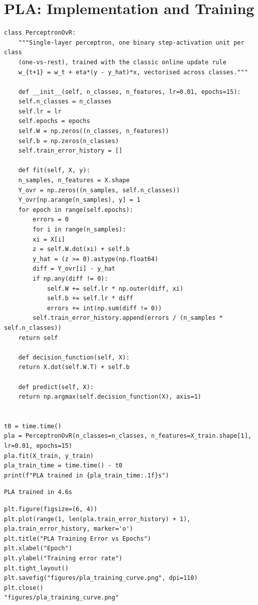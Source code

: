 \documentclass[11pt]{article}
\begin{document}
\section{PLA: Implementation and Training}
\label{sec:org7e2eefa}

\begin{verbatim}
class PerceptronOvR:
    """Single-layer perceptron, one binary step-activation unit per class
    (one-vs-rest), trained with the classic online update rule
    w_{t+1} = w_t + eta*(y - y_hat)*x, vectorised across classes."""

    def __init__(self, n_classes, n_features, lr=0.01, epochs=15):
	self.n_classes = n_classes
	self.lr = lr
	self.epochs = epochs
	self.W = np.zeros((n_classes, n_features))
	self.b = np.zeros(n_classes)
	self.train_error_history = []

    def fit(self, X, y):
	n_samples, n_features = X.shape
	Y_ovr = np.zeros((n_samples, self.n_classes))
	Y_ovr[np.arange(n_samples), y] = 1
	for epoch in range(self.epochs):
	    errors = 0
	    for i in range(n_samples):
		xi = X[i]
		z = self.W.dot(xi) + self.b
		y_hat = (z >= 0).astype(np.float64)
		diff = Y_ovr[i] - y_hat
		if np.any(diff != 0):
		    self.W += self.lr * np.outer(diff, xi)
		    self.b += self.lr * diff
		    errors += int(np.sum(diff != 0))
	    self.train_error_history.append(errors / (n_samples * self.n_classes))
	return self

    def decision_function(self, X):
	return X.dot(self.W.T) + self.b

    def predict(self, X):
	return np.argmax(self.decision_function(X), axis=1)


t0 = time.time()
pla = PerceptronOvR(n_classes=n_classes, n_features=X_train.shape[1], lr=0.01, epochs=15)
pla.fit(X_train, y_train)
pla_train_time = time.time() - t0
print(f"PLA trained in {pla_train_time:.1f}s")
\end{verbatim}

\begin{verbatim}
PLA trained in 4.6s
\end{verbatim}


\begin{verbatim}
plt.figure(figsize=(6, 4))
plt.plot(range(1, len(pla.train_error_history) + 1), pla.train_error_history, marker='o')
plt.title("PLA Training Error vs Epochs")
plt.xlabel("Epoch")
plt.ylabel("Training error rate")
plt.tight_layout()
plt.savefig("figures/pla_training_curve.png", dpi=110)
plt.close()
"figures/pla_training_curve.png"
\end{verbatim}
\end{document}
